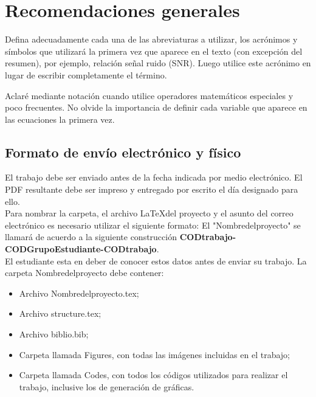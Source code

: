 \documentclass[
10pt,			%
letterpaper,	%
oneside,		%
headinclude, footinclude, %
BCOR5mm, 		%
]{scrartcl}
\begin{document}

\section{Recomendaciones generales}

Defina adecuadamente cada una de las abreviaturas a utilizar, los acrónimos y símbolos que utilizará la primera vez que aparece en el texto (con excepción del resumen), por ejemplo, relación señal ruido (SNR). Luego utilice este acrónimo en lugar de escribir completamente el término.

Aclaré mediante notación cuando utilice operadores matemáticos especiales y poco frecuentes. No olvide la importancia de definir cada variable que aparece en las ecuaciones la primera vez.

\subsection{Formato de envío electrónico y físico}

El trabajo debe ser enviado antes de la fecha indicada por medio electrónico. El PDF resultante debe ser impreso y entregado por escrito el día designado para ello.\\
Para nombrar la carpeta, el archivo \LaTeX del proyecto y el asunto del correo electrónico es necesario utilizar el siguiente formato: El "Nombredelproyecto" se llamará de acuerdo a la siguiente construcción \textbf{CODtrabajo-CODGrupoEstudiante-CODtrabajo}.\\
El estudiante esta en deber de conocer estos datos antes de enviar su trabajo. La carpeta Nombredelproyecto debe contener:
\begin{itemize}[noitemsep] %
	\item Archivo Nombredelproyecto.tex;
	\item Archivo structure.tex; %
	\item Archivo biblio.bib; %
	\item Carpeta llamada Figures, con todas las imágenes incluidas en el trabajo;
	\item Carpeta llamada Codes, con todos los códigos utilizados para realizar el trabajo, inclusive los de generación de gráficas.
\end{itemize}
\end{document}
